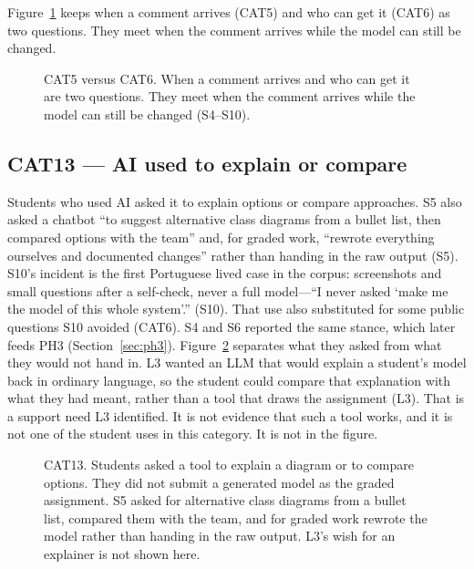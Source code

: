 Figure~\ref{fig:cat5_cat6} keeps when a comment arrives (CAT5) and who can get it (CAT6) as two questions. They meet when the comment arrives while the model can still be changed.

\begin{figure}[htbp]
\centering

\caption{CAT5 versus CAT6. When a comment arrives and who can get it are two questions. They meet when the comment arrives while the model can still be changed (S4--S10).}
\label{fig:cat5_cat6}
\end{figure}

\subsection{CAT13 --- AI used to explain or compare}
\label{sec:cat13}

Students who used AI asked it to explain options or compare approaches. S5 also asked a chatbot ``to suggest alternative class diagrams from a bullet list, then compared options with the team'' and, for graded work, ``rewrote everything ourselves and documented changes'' rather than handing in the raw output (S5). S10's incident is the first Portuguese lived case in the corpus: screenshots and small questions after a self-check, never a full model---``I never asked `make me the model of this whole system'.'' (S10). That use also substituted for some public questions S10 avoided (CAT6). S4 and S6 reported the same stance, which later feeds PH3 (Section~\ref{sec:ph3}). Figure~\ref{fig:cat13} separates what they asked from what they would not hand in. L3 wanted an LLM that would explain a student's model back in ordinary language, so the student could compare that explanation with what they had meant, rather than a tool that draws the assignment (L3). That is a support need L3 identified. It is not evidence that such a tool works, and it is not one of the student uses in this category. It is not in the figure.

\begin{figure}[htbp]
\centering

\caption{CAT13. Students asked a tool to explain a diagram or to compare options. They did not submit a generated model as the graded assignment. S5 asked for alternative class diagrams from a bullet list, compared them with the team, and for graded work rewrote the model rather than handing in the raw output. L3's wish for an explainer is not shown here.}
\label{fig:cat13}
\end{figure}

